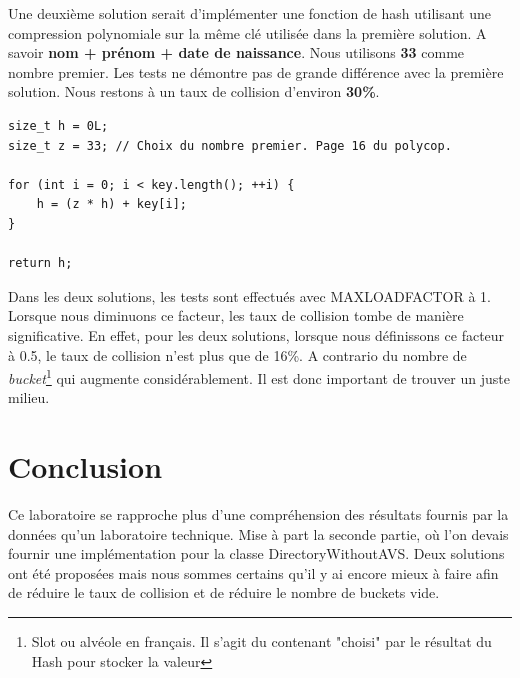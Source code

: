 \documentclass[11pt,a4paper]{article}
\begin{document}
Une deuxième solution serait d'implémenter une fonction de hash utilisant une compression polynomiale sur la même clé utilisée dans la première solution. A savoir \textbf{nom + prénom + date de naissance}. Nous utilisons \textbf{33} comme nombre premier. Les tests ne démontre pas de grande différence avec la première solution. Nous restons à un taux de collision d'environ \textbf{30\%}.

\begin{lstlisting}[frame=single] 
size_t h = 0L;
size_t z = 33; // Choix du nombre premier. Page 16 du polycop.

for (int i = 0; i < key.length(); ++i) {
	h = (z * h) + key[i];
}

return h;
\end{lstlisting}

Dans les deux solutions, les tests sont effectués avec MAX\textunderscore LOAD\textunderscore FACTOR à 1. Lorsque nous diminuons ce facteur, les taux de collision tombe de manière significative. En effet, pour les deux solutions, lorsque nous définissons ce facteur à 0.5, le taux de collision n'est plus que de 16\%. A contrario du nombre de \textit{bucket}\footnote{Slot ou alvéole en français. Il s'agit du contenant "choisi" par le résultat du Hash pour stocker la valeur } qui augmente considérablement. Il est donc important de trouver un juste milieu.
\section{Conclusion}
Ce laboratoire se rapproche plus d'une compréhension des résultats fournis par la données qu'un laboratoire technique. Mise à part la seconde partie, où l'on devais fournir une implémentation pour la classe DirectoryWithoutAVS. Deux solutions ont été proposées mais nous sommes certains qu'il y ai encore mieux à faire afin de réduire le taux de collision et de réduire le nombre de buckets vide.
\end{document}
